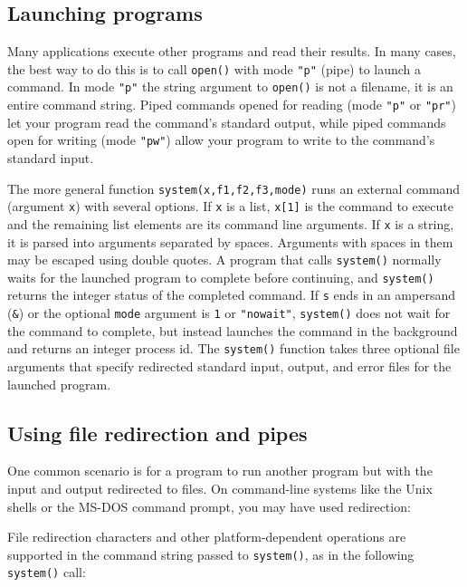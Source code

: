 \subsection*{Launching programs}

Many applications execute other programs and read their results. In many cases,
the best way to do this is to call \texttt{open()} with mode \texttt{"p"}
(pipe) to launch a command. In mode \texttt{"p"} the string argument
to \texttt{open()} is not a filename, it is an entire command string. Piped
commands opened for reading (mode \texttt{"p"} or \texttt{"pr"}) let your
program read the command's standard output, while piped commands open for
writing (mode \texttt{"pw"}) allow your program to write to the command's
standard input.

The more general function \texttt{system(x,f1,f2,f3,mode)} runs an external
command (argument \texttt{x}) with several options. If \texttt{x} is a list,
\texttt{x[1]} is the command to execute and the remaining list elements are its
command line arguments. If \texttt{x} is a string, it is parsed into arguments
separated by spaces. Arguments with spaces in them may be escaped using double
quotes. A program that calls \texttt{system()} normally waits
for the launched program to complete before continuing, and \texttt{system()}
returns the integer status of the completed command. If \texttt{s} ends in an
ampersand (\texttt{\&}) or the optional \texttt{mode} argument is \texttt{1} or
\texttt{"nowait"}, \texttt{system()} does not wait for the command to complete,
but instead launches the command in the background and returns an integer
process id. The \texttt{system()} function takes three optional file arguments
that specify redirected standard input, output, and error files for the launched
program.

\subsection*{Using file redirection and pipes}

One common scenario is for a program to run
another program but with the input and output redirected to files. On
command-line systems like the Unix shells or the MS-DOS command prompt,
you may have used redirection:


\noindent
File redirection characters and other platform-dependent operations are
supported in the command string passed to \texttt{system()}, as
in the following \texttt{system()} call:

